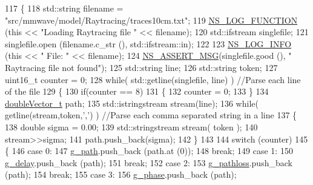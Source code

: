 \begin{DoxyCode}
117 \{
118         std::string filename = \textcolor{stringliteral}{"src/mmwave/model/Raytracing/traces10cm.txt"};
119         \hyperlink{log-macros-disabled_8h_a90b90d5bad1f39cb1b64923ea94c0761}{NS\_LOG\_FUNCTION} (\textcolor{keyword}{this} << \textcolor{stringliteral}{"Loading Raytracing file "} << filename);
120         std::ifstream singlefile;
121         singlefile.open (filename.c\_str (), std::ifstream::in);
122 
123         \hyperlink{group__logging_gafbd73ee2cf9f26b319f49086d8e860fb}{NS\_LOG\_INFO} (\textcolor{keyword}{this} << \textcolor{stringliteral}{" File: "} << filename);
124         \hyperlink{assert_8h_aff5ece9066c74e681e74999856f08539}{NS\_ASSERT\_MSG}(singlefile.good (), \textcolor{stringliteral}{" Raytracing file not found"});
125     std::string line;
126     std::string token;
127     uint16\_t counter = 0;
128     \textcolor{keywordflow}{while}( std::getline(singlefile, line) ) \textcolor{comment}{//Parse each line of the file}
129     \{
130         \textcolor{keywordflow}{if}(counter == 8)
131         \{
132                 counter = 0;
133         \}
134         \hyperlink{namespacens3_aa6f1edf6566ca6afec613bc6e40240ea}{doubleVector\_t} path;
135         std::istringstream stream(line);
136         \textcolor{keywordflow}{while}( getline(stream,token,\textcolor{charliteral}{','}) ) \textcolor{comment}{//Parse each comma separated string in a line}
137         \{
138             \textcolor{keywordtype}{double} sigma = 0.00;
139             std::stringstream stream( token );
140             stream>>sigma;
141                 path.push\_back(sigma);
142                 \}
143 
144                 \textcolor{keywordflow}{switch} (counter)
145                 \{
146                 \textcolor{keywordflow}{case} 0:
147                         \hyperlink{namespacens3_aa9bd92de8f4cfc681e22ff5b45e141c6}{g\_path}.push\_back (path.at (0));
148                         \textcolor{keywordflow}{break};
149                 \textcolor{keywordflow}{case} 1:
150                         \hyperlink{namespacens3_a9ae8878579236b1567aca15ee5d820b7}{g\_delay}.push\_back (path);
151                         \textcolor{keywordflow}{break};
152                 \textcolor{keywordflow}{case} 2:
153                         \hyperlink{namespacens3_a7393b978973ee32cbf20a99c193f3aa7}{g\_pathloss}.push\_back (path);
154                         \textcolor{keywordflow}{break};
155                 \textcolor{keywordflow}{case} 3:
156                         \hyperlink{namespacens3_a9cf5be6b6a45b7a18d9f31e3ccfa3092}{g\_phase}.push\_back (path);

\end{DoxyCode}

